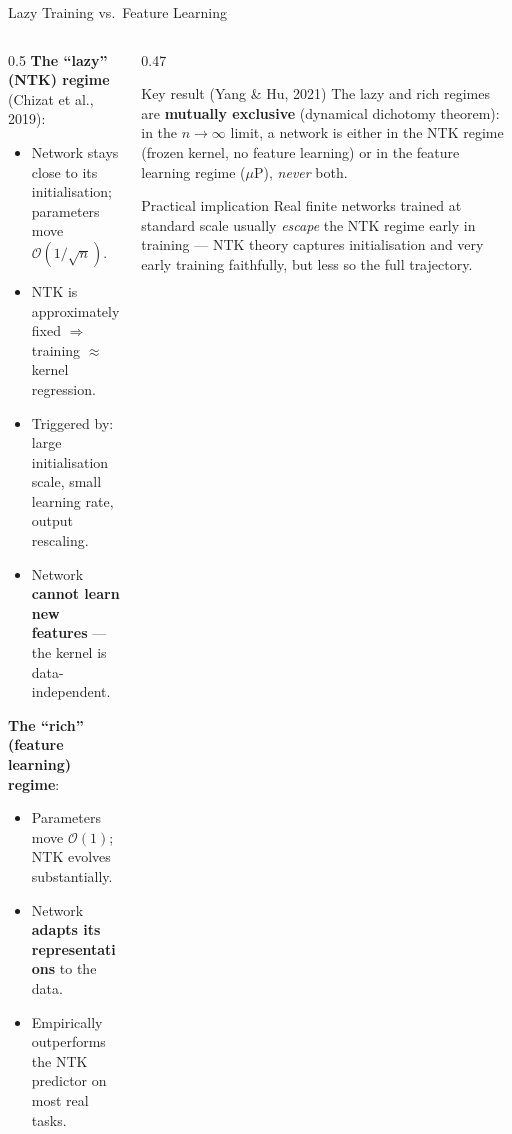 \documentclass[aspectratio=169, 10pt]{beamer}
\newcommand{\highlight}[1]{\textcolor{blue!70!black}{\textbf{#1}}}
\begin{document}
\begin{frame}{Lazy Training vs.\ Feature Learning}
  \begin{columns}[T]
    \begin{column}{0.5\textwidth}
      \textbf{The ``lazy'' (NTK) regime} (Chizat et al., 2019):
      \begin{itemize}
        \item Network stays close to its initialisation; parameters move $\mathcal{O}(1/\sqrt{n})$.
        \item NTK is approximately fixed $\Rightarrow$ training $\approx$ kernel regression.
        \item Triggered by: large initialisation scale, small learning rate, output rescaling.
        \item Network \highlight{cannot learn new features} — the kernel is data-independent.
      \end{itemize}
      \vspace{0.4em}
      \textbf{The ``rich'' (feature learning) regime}:
      \begin{itemize}
        \item Parameters move $\mathcal{O}(1)$; NTK evolves substantially.
        \item Network \highlight{adapts its representations} to the data.
        \item Empirically outperforms the NTK predictor on most real tasks.
      \end{itemize}
    \end{column}
    \begin{column}{0.47\textwidth}
      \begin{alertblock}{Key result (Yang \& Hu, 2021)}
        The lazy and rich regimes are \textbf{mutually exclusive} (dynamical dichotomy theorem): in the $n\to\infty$ limit, a network is either in the NTK regime (frozen kernel, no feature learning) or in the feature learning regime ($\mu$P), \emph{never} both.
      \end{alertblock}

      \vspace{0.4em}
      \begin{exampleblock}{Practical implication}
        Real finite networks trained at standard scale usually \emph{escape} the NTK regime early in training — NTK theory captures initialisation and very early training faithfully, but less so the full trajectory.
      \end{exampleblock}
    \end{column}
  \end{columns}
\end{frame}
\end{document}
